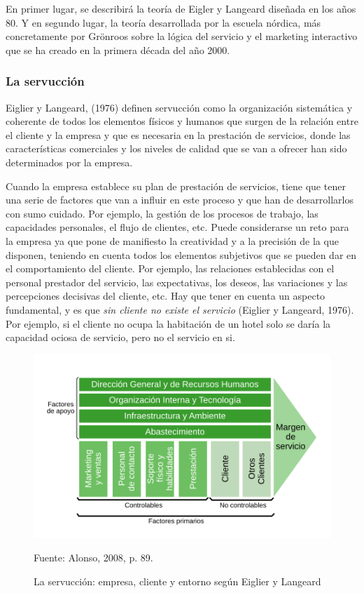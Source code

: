 En primer lugar, se describirá la teoría de Eigler y Langeard diseñada en los años 80. Y en segundo lugar, la teoría desarrollada por la escuela nórdica, más concretamente por Grönroos sobre la lógica del servicio y el marketing interactivo que se ha creado en la primera década del año 2000.

\subsubsection{La servucción}

Eiglier y Langeard, (1976) definen servucción como la organización sistemática y coherente de todos los elementos físicos y humanos que surgen de la relación entre el cliente y la empresa y que es necesaria en la prestación de servicios, donde las características comerciales y los niveles de calidad que se van a ofrecer han sido determinados por la empresa.

Cuando la empresa establece su plan de prestación de servicios, tiene que tener una serie de factores que van a influir en este proceso y que han de desarrollarlos con sumo cuidado. Por ejemplo, la gestión de los procesos de trabajo, las capacidades personales, el flujo de clientes, etc. Puede considerarse un reto para la empresa ya que pone de manifiesto la creatividad y a la precisión de la que disponen, teniendo en cuenta todos los elementos subjetivos que se pueden dar en el comportamiento del cliente. Por ejemplo, las relaciones establecidas con el personal prestador del servicio, las expectativas, los deseos, las variaciones y las percepciones decisivas del cliente, etc. Hay que tener en cuenta un aspecto fundamental, y es que \emph{sin cliente no existe el servicio} (Eiglier y Langeard, 1976). Por ejemplo, si el cliente no ocupa la habitación de un hotel solo se daría la capacidad ociosa de servicio, pero no el servicio en si. 

\begin{figure}[!h]
	\caption{La servucción: empresa, cliente y entorno según Eiglier y Langeard}
	\centering \includegraphics[width=140mm]{capitulos/graficos/servuccion} 
	\label{fig:servuccion} 

	\footnotesize
		Fuente: Alonso, 2008, p. 89.
\end{figure}

